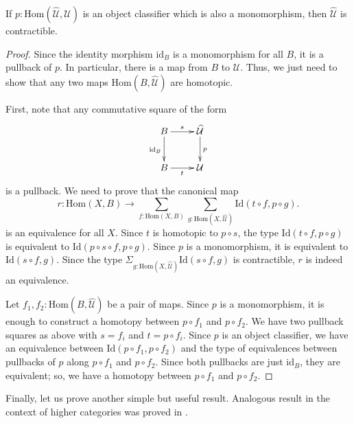 \documentclass[reqno]{amsart}
\theoremstyle{definition}
\theoremstyle{remark}
\newcommand{\fs}[1]{\mathrm{#1}}
\newcommand{\Hom}{\fs{Hom}}
\newcommand{\Id}{\fs{Id}}
\newcommand{\id}{\fs{id}}
\numberwithin{figure}{section}
\begin{document}
\begin{prop}
If $p : \Hom(\widehat{\mathcal{U}},\mathcal{U})$ is an object classifier which is also a monomorphism, then $\widehat{\mathcal{U}}$ is contractible.
\end{prop}
\begin{proof}
Since the identity morphism $\id_B$ is a monomorphism for all $B$, it is a pullback of $p$.
In particular, there is a map from $B$ to $\widehat{\mathcal{U}}$.
Thus, we just need to show that any two maps $\Hom(B,\widehat{\mathcal{U}})$ are homotopic.

First, note that any commutative square of the form
\[ \xymatrix{ B \ar[r]^s \ar[d]_{\id_B} & \widehat{\mathcal{U}} \ar[d]^p \\
              B \ar[r]_t                & \mathcal{U}
            } \]
is a pullback.
We need to prove that the canonical map
\[ r : \Hom(X,B) \to \sum_{f : \Hom(X,B)} \sum_{g : \Hom(X,\widehat{\mathcal{U}})} \Id(t \circ f, p \circ g). \]
is an equivalence for all $X$.
Since $t$ is homotopic to $p \circ s$, the type $\Id(t \circ f, p \circ g)$ is equivalent to $\Id(p \circ s \circ f, p \circ g)$.
Since $p$ is a monomorphism, it is equivalent to $\Id(s \circ f, g)$.
Since the type $\Sigma_{g : \Hom(X,\widehat{\mathcal{U}})} \Id(s \circ f, g)$ is contractible, $r$ is indeed an equivalence.

Let $f_1,f_2 : \Hom(B,\widehat{\mathcal{U}})$ be a pair of maps.
Since $p$ is a monomorphism, it is enough to construct a homotopy between $p \circ f_1$ and $p \circ f_2$.
We have two pullback squares as above with $s = f_i$ and $t = p \circ f_i$.
Since $p$ is an object classifier, we have an equivalence between $\Id(p \circ f_1, p \circ f_2)$ and the type of equivalences between pullbacks of $p$ along $p \circ f_1$ and $p \circ f_2$.
Since both pullbacks are just $\id_B$, they are equivalent; so, we have a homotopy between $p \circ f_1$ and $p \circ f_2$.
\end{proof}

Finally, let us prove another simple but useful result.
Analogous result in the context of higher categories was proved in \cite[Theorem~3.28]{rasekh-eht}.
\end{document}
